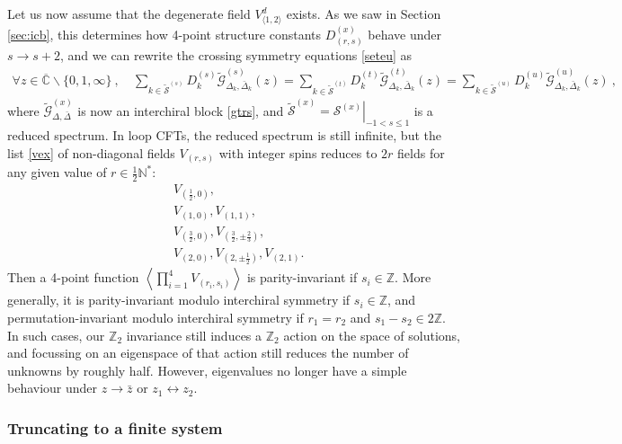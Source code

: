\documentclass[12pt, a4paper]{article}
\theoremstyle{break}
\begin{document}
Let us now assume that the degenerate field $V^d_{\langle 1,2\rangle}$ exists. 
As we saw in Section \ref{sec:icb}, this determines how 4-point structure constants $D^{(x)}_{(r,s)}$ behave under $s\to s+2$, and we can rewrite the crossing symmetry equations \eqref{seteu} as 
\begin{align}
 \forall z\in \overline{\mathbb{C}}\backslash\{0,1,\infty\} \ , \quad \sum_{k\in\widetilde{\mathcal{S}}^{(s)}} D_k^{(s)} \widetilde{\mathcal{G}}^{(s)}_{\Delta_k,\bar\Delta_k}(z) = \sum_{k\in\widetilde{\mathcal{S}}^{(t)}} D_k^{(t)} \widetilde{\mathcal{G}}^{(t)}_{\Delta_k,\bar\Delta_k}(z) = \sum_{k\in\widetilde{\mathcal{S}}^{(u)}} D_k^{(u)} \widetilde{\mathcal{G}}^{(u)}_{\Delta_k,\bar\Delta_k}(z)\ ,
\end{align}
where $\widetilde{\mathcal{G}}^{(x)}_{\Delta,\bar\Delta}$ is now an interchiral block \eqref{gtrs}, and $\widetilde{\mathcal{S}}^{(x)}=\left.\mathcal{S}^{(x)}\right|_{-1<s\leq 1}$ is a reduced spectrum. In loop CFTs, the reduced spectrum is still infinite, but the list \eqref{vex} of non-diagonal fields $V_{(r,s)}$ with integer spins reduces to $2r$ fields for any given value of $r\in\frac12\mathbb{N}^*$:
\begin{subequations}
\label{vexr}
\begin{align}
 & V_{(\frac12, 0)},
 \\
 & V_{(1,0)}, V_{(1,1)}, 
 \\
 & V_{(\frac32, 0)}, V_{(\frac32, \pm\frac23)}, 
 \\
 & V_{(2, 0)}, V_{(2,\pm\frac12)}, V_{(2,1)}.
\end{align}
\end{subequations}
Then a 4-point function $\left<\prod_{i=1}^4 V_{(r_i,s_i)}\right>$ is parity-invariant if $s_i\in\mathbb{Z}$. More generally, it is parity-invariant 
modulo interchiral symmetry if $s_i\in\mathbb{Z}$, and permutation-invariant modulo interchiral symmetry if $r_1=r_2$ and $s_1-s_2\in 2\mathbb{Z}$. In such cases, our $\mathbb{Z}_2$ invariance still induces a $\mathbb{Z}_2$ action on the space of solutions, and focussing on an eigenspace of that action still reduces the number of unknowns by roughly half. However, eigenvalues no longer have a simple behaviour under $z\to \bar z$ or $z_1\leftrightarrow z_2$.


\subsubsection{Truncating to a finite system}
\end{document}
